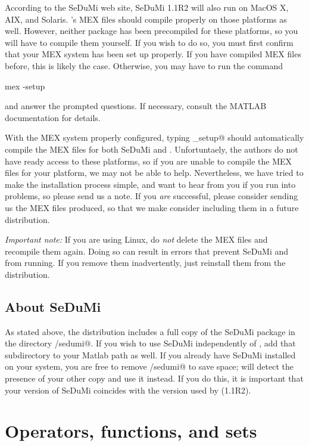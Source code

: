 \documentclass[12pt]{article}
\begin{document}
According to the SeDuMi web site, SeDuMi 1.1R2 will also run on MacOS X, AIX, and 
Solaris. \cvx's MEX files should compile properly on those platforms as well. However,
neither package has been precompiled for these platforms, so you will have to compile
them yourself. If you wish to do so, you must first
confirm that your MEX system has been set up properly. If you have compiled
MEX files before, this is likely the case. Otherwise, you may have to run 
the command
\begin{code}
	mex -setup
\end{code}
and answer the prompted questions. If necessary, consult the MATLAB documentation for details.

With the MEX system properly configured, typing \verb@cvx_setup@ should automatically
compile the MEX files for both SeDuMi and \cvx. Unfortuntaely, the authors do not have ready access to these platforms, so if you
are unable to compile the MEX files for your platform, we may not be able to help.
Nevertheless, we have tried to make the installation process simple, and 
want to hear from you if you run into problems, so please send us a note. If
you \emph{are} successful, please consider sending us the MEX files produced,
so that we make consider including them in a future \cvx distribution.

\emph{Important note:} If you are using Linux,
do \emph{not} delete the MEX files and recompile them again.
Doing so can result in  errors that prevent SeDuMi and \cvx from running.
If you remove them inadvertently, just reinstall them from the distribution.

\subsection{About SeDuMi}

As stated above, 
the \cvx distribution includes a full copy of the SeDuMi package
in the directory \verb@cvx/sedumi@.
If you wish to use SeDuMi independently of \cvx, 
add that subdirectory to your Matlab path as well. 
If you already have SeDuMi installed on your system, you are free to remove
\verb@cvx/sedumi@ to save space; \cvx will detect the presence of your other
copy and use it instead. If you do this, it is important that
your version of SeDuMi coincides with the version used by \cvx (1.1R2).

\section{Operators, functions, and sets}
\label{s-functions}
\end{document}
